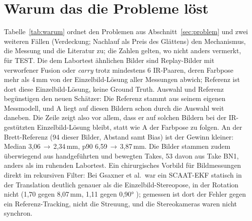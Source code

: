 \documentclass[11pt,a4paper,fleqn]{article}
\begin{document}
\section{Warum das die Probleme löst}
\label{sec:warum}

Tabelle~\ref{tab:warum} ordnet den Problemen aus Abschnitt~\ref{sec:problem} und zwei weiteren Fällen
(Verdeckung; Nachlauf als Preis des Glättens) den Mechanismus, die Messung und die Literatur zu; die Zahlen gelten,
wo nicht anders vermerkt, für TEST. Die \glqq dem Labortest ähnlichen Bilder\grqq{} sind Replay-Bilder mit
verworfener Fusion oder \emph{carry} trotz mindestens 6 IR-Paaren, deren Farbpose mehr als 4\,mm von der
Einzelbild-Lösung aller Messungen abwich; Referenz ist dort diese Einzelbild-Lösung, keine Ground Truth. Auswahl
und Referenz begünstigen den neuen Schätzer: Die Referenz stammt aus seinem eigenen Messmodell, und A liegt auf
diesen Bildern schon durch die Auswahl weit daneben. Die Zeile zeigt also vor allem, dass er auf solchen Bildern
bei der IR-gestützten Einzelbild-Lösung bleibt, statt wie A der Farbpose zu folgen. An der Brett-Referenz (94
dieser Bilder, Abstand samt Bias) ist der Gewinn kleiner: Median 3,06\,$\to$\,2,34\,mm, p90
6,59\,$\to$\,3,87\,mm. Die Bilder stammen zudem überwiegend aus handgeführten und bewegten Takes, 53 davon aus
Take BN1, anders als im ruhenden Labortest. Ein chirurgisches Vorbild für Bildmessungen direkt im rekursiven
Filter: Bei Gsaxner et al.\ war ein SCAAT-EKF statisch in der Translation deutlich genauer als die
Einzelbild-Stereopose, in der Rotation nicht (1,70 gegen 8,07\,mm, 1,11 gegen 0,90°
\cite[Tab.~1]{gsaxner2021insideout}); gemessen ist dort der Fehler gegen ein Referenz-Tracking, nicht die
Streuung, und die Stereokameras waren nicht synchron.
\end{document}
